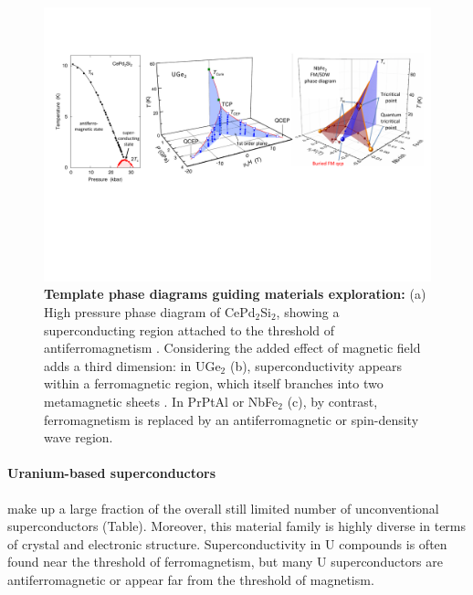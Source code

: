 \begin{figure}
  \includegraphics[width=1.9\columnwidth]{Figures/PhaseDias.pdf}
  \caption{{\bf Template phase diagrams guiding materials exploration:}  (a) High pressure phase diagram of CePd$_2$Si$_2$, showing a superconducting region attached to the 
  threshold of antiferromagnetism \protect{}. Considering the added effect of magnetic field adds a third dimension:
  in UGe$_2$ (b), 
  superconductivity appears within a ferromagnetic region, which itself branches into two metamagnetic sheets \protect\cite{kotegawa11}. In PrPtAl or NbFe$_2$ \protect{} (c), by contrast, ferromagnetism is replaced by an antiferromagnetic or spin-density wave region.
  }
  \label{fig:Guiding}
  
\end{figure}
  
  
\paragraph{Uranium-based superconductors} make up a large fraction of the overall still limited number of unconventional superconductors (Table). Moreover, this material family is highly diverse in terms of crystal and electronic structure. Superconductivity in U compounds is often found near the threshold of ferromagnetism, but many U superconductors are antiferromagnetic or appear far from the threshold of magnetism. 



